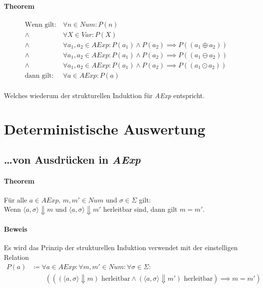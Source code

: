 				\paragraph{Theorem}
					\begin{align*}
						\text{Wenn gilt:} & \,\forall n \in \textit{Num} : P(n)                                                                  \\
						\land             & \,\forall X \in \textit{Var} : P(X)                                                                  \\
						\land             & \,\forall a _ 1, a _ 2 \in \textit{AExp} : P(a _ 1) \land P(a _ 2) \implies P((a _ 1 \oplus a _ 2))  \\
						\land             & \,\forall a _ 1, a _ 2 \in \textit{AExp} : P(a _ 1) \land P(a _ 2) \implies P((a _ 1 \ominus a _ 2)) \\
						\land             & \,\forall a _ 1, a _ 2 \in \textit{AExp} : P(a _ 1) \land P(a _ 2) \implies P((a _ 1 \odot a _ 2))   \\
						\text{dann gilt:} & \,\forall a \in \textit{AExp} : P(a)                                                                 \\
					\end{align*}

					Welches wiederum der strukturellen Induktion für \textit{AExp} entspricht.

	\section{Deterministische Auswertung}
		\subsection{\dots von Ausdrücken in \textit{AExp}}
			\paragraph{Theorem}
				Für alle $ a \in \textit{AExp} $, $ m, m' \in \textit{Num} $ und $ \sigma \in \Sigma $ gilt: \\
				Wenn $ \langle a, \sigma \rangle \Downarrow m $ und $ \langle a, \sigma \rangle \Downarrow m' $ herleitbar sind, dann gilt $ m = m' $.

			\paragraph{Beweis}
				Es wird das Prinzip der strukturellen Induktion verwendet mit der einstelligen Relation
				\begin{align*}
					P(a) & \coloneqq \forall a \in \textit{AExp} : \forall m, m' \in \textit{Num} : \forall \sigma \in \Sigma :                                                          \\
					     & \quad\quad (((\langle a, \sigma \rangle \Downarrow m) \text{ herleitbar} \land (\langle a, \sigma \rangle \Downarrow m') \text{ herleitbar}) \implies m = m') \\
				\end{align*}

